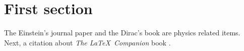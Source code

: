 \documentclass[draft]{article}
\begin{document}
	\section{First section}
	
	The Einstein's journal paper \autocite{KandR} and the Dirac's book \autocite[42]{CUEDCplusplus} are physics related items. Next, a citation about \textit{The \LaTeX\ Companion} book \autocites{KandR}{CUEDCplusplus} .
	
	
	\printbibliography
\end{document}
